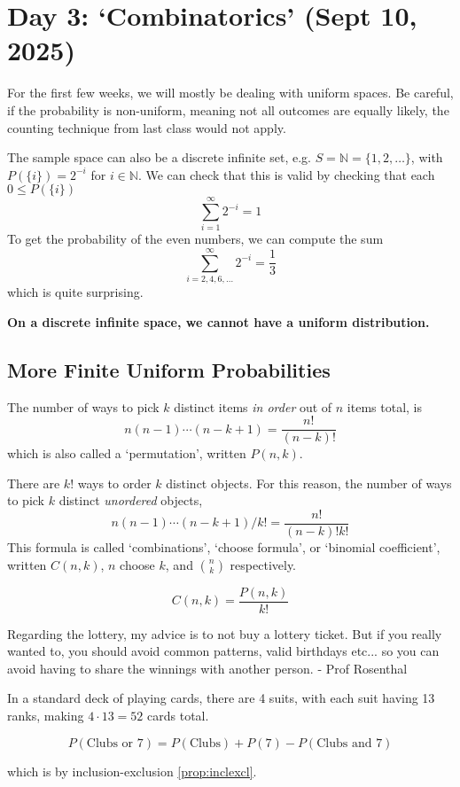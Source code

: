 \section{Day 3: `Combinatorics' (Sept 10, 2025)}

For the first few weeks, we will mostly be dealing with uniform spaces. Be careful, if the probability is non-uniform, meaning not all outcomes are equally likely, the counting technique from last class would not apply.

The sample space can also be a discrete infinite set, e.g. $S = \mathbb{N} = \{ 1, 2, \dots \}$, with $P(\{ i \}) = 2^{-i}$ for $i \in \mathbb{N}$. We can check that this is valid by checking that each $0 \leq P(\{ i \})$
\[
\sum_{i=1}^{\infty} 2^{-i} = 1
\]
To get the probability of the even numbers, we can compute the sum
\[
\sum_{i=2,4,6,\dots}^{\infty} 2^{-i} = \frac{1}{3}
\]
which is quite surprising.

\noindent \textbf{On a discrete infinite space, we cannot have a uniform distribution.}

\subsection{More Finite Uniform Probabilities}

The number of ways to pick $k$ distinct items \textit{in order} out of $n$ items total, is
\[
n(n-1) \cdots (n-k+1) = \frac{n!}{(n-k)!}
\]
which is also called a `permutation', written $P(n, k)$.

There are $k!$ ways to order $k$ distinct objects. For this reason, the number of ways to pick $k$ distinct \textit{unordered} objects,
\[
n(n-1) \cdots (n-k+1) / k! = \frac{n!}{(n-k)!k!}
\]
This formula is called `combinations', `choose formula', or `binomial coefficient', written $C(n, k)$, $n$ choose $k$, and $\binom{n}{k}$ respectively. 

\[
C(n, k) = \frac{P(n, k)}{k!}
\]

\begin{remark}
Regarding the lottery, my advice is to not buy a lottery ticket. But if you really wanted to, you should avoid common patterns, valid birthdays etc... so you can avoid having to share the winnings with another person. - Prof Rosenthal
\end{remark}

In a standard deck of playing cards, there are 4 suits, with each suit having 13 ranks, making $4 \cdot 13 = 52$ cards total. 

\[
P(\text{Clubs or $7$}) = P(\text{Clubs}) + P(7) - P(\text{Clubs and $7$})
\]

\noindent which is by inclusion-exclusion \ref{prop:inclexcl}. 
